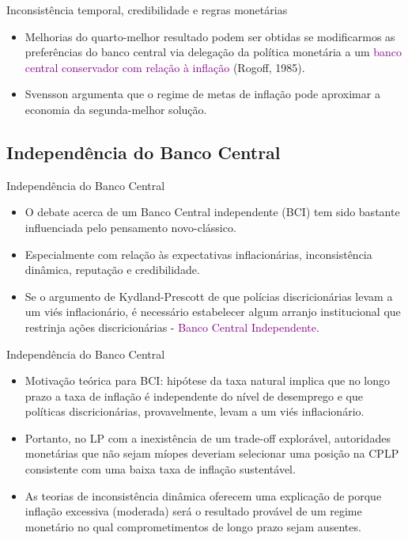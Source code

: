 \documentclass[10pt]{beamer}
\begin{document}
\begin{frame}{Inconsistência temporal, credibilidade e regras monetárias}
    \begin{itemize}
        \item Melhorias do quarto-melhor resultado podem ser obtidas se modificarmos as preferências do banco central via delegação da política monetária a um \textcolor{purple}{banco central conservador com relação à inflação} (Rogoff, 1985).
        \bigskip
        \item Svensson argumenta que o regime de metas de inflação pode aproximar a economia da segunda-melhor solução.
    \end{itemize}
\end{frame}

\subsection{Independência do Banco Central}
\begin{frame}{Independência do Banco Central}
    \begin{itemize}
        \item O debate acerca de um Banco Central independente (BCI) tem sido bastante influenciada pelo pensamento novo-clássico.
        \bigskip
        \item Especialmente com relação às expectativas inflacionárias, inconsistência dinâmica, reputação e credibilidade.
        \bigskip
        \item Se o argumento de Kydland-Prescott de que polícias discricionárias levam a um viés inflacionário, é necessário estabelecer algum arranjo institucional que restrinja ações discricionárias - \textcolor{purple}{Banco Central Independente}.
    \end{itemize}
\end{frame}

\begin{frame}{Independência do Banco Central}
    \begin{itemize}
        \item Motivação teórica para BCI: hipótese da taxa natural implica que no longo prazo a taxa de inflação é independente do nível de desemprego e que políticas discricionárias, provavelmente, levam a um viés inflacionário.
        \bigskip
        \item Portanto, no LP com a inexistência de um trade-off explorável, autoridades monetárias que não sejam míopes deveriam selecionar uma posição na CPLP consistente com uma baixa taxa de inflação sustentável.
        \bigskip
        \item As teorias de inconsistência dinâmica oferecem uma explicação de porque inflação excessiva (moderada) será o resultado provável de um regime monetário no qual comprometimentos de longo prazo sejam ausentes.
    \end{itemize}
\end{frame}
\end{document}
